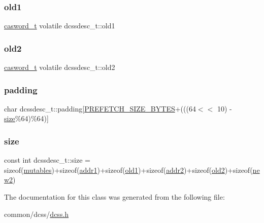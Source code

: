 \mbox{\label{classdcssdesc__t_aafaef5d8bba1a492dfe0268b381709c3}} 
\subsubsection{\texorpdfstring{old1}{old1}}
{\footnotesize\ttfamily \hyperlink{rq__unsafe_8h_ad45142aaf2ff20a036dc6242b8483e9c}{casword\+\_\+t} volatile dcssdesc\+\_\+t\+::old1}

\mbox{\label{classdcssdesc__t_a059d5c222ad94e927c840f01b7850952}} 
\subsubsection{\texorpdfstring{old2}{old2}}
{\footnotesize\ttfamily \hyperlink{rq__unsafe_8h_ad45142aaf2ff20a036dc6242b8483e9c}{casword\+\_\+t} volatile dcssdesc\+\_\+t\+::old2}

\mbox{\label{classdcssdesc__t_acf8b5fd8e88fc6bf7d21b6c7daf3fcf3}} 
\subsubsection{\texorpdfstring{padding}{padding}}
{\footnotesize\ttfamily char dcssdesc\+\_\+t\+::padding\mbox{[}\hyperlink{plaf_8h_a9492d3f4847aa8514510373df7ad0e73}{P\+R\+E\+F\+E\+T\+C\+H\+\_\+\+S\+I\+Z\+E\+\_\+\+B\+Y\+T\+ES}+(((64$<$$<$ 10) -\/\hyperlink{classdcssdesc__t_a7807beda79b554a70aacdf089dfe6b73}{size}\%64)\%64)\mbox{]}}

\mbox{\label{classdcssdesc__t_a7807beda79b554a70aacdf089dfe6b73}} 
\subsubsection{\texorpdfstring{size}{size}}
{\footnotesize\ttfamily const int dcssdesc\+\_\+t\+::size = sizeof(\hyperlink{classdcssdesc__t_af1008652cb54a2fa90eb657d61c0038a}{mutables})+sizeof(\hyperlink{classdcssdesc__t_a61326e9aa1b6b4d49461340997dcb636}{addr1})+sizeof(\hyperlink{classdcssdesc__t_aafaef5d8bba1a492dfe0268b381709c3}{old1})+sizeof(\hyperlink{classdcssdesc__t_a582de2e5799592e124400d256c85b281}{addr2})+sizeof(\hyperlink{classdcssdesc__t_a059d5c222ad94e927c840f01b7850952}{old2})+sizeof(\hyperlink{classdcssdesc__t_aa8e70f20c6b69b7a9a604fa15c4de10c}{new2})\hspace{0.3cm}{\ttfamily [static]}}



The documentation for this class was generated from the following file\+:\begin{DoxyCompactItemize}
\item 
common/dcss/\hyperlink{dcss_8h}{dcss.\+h}\end{DoxyCompactItemize}
